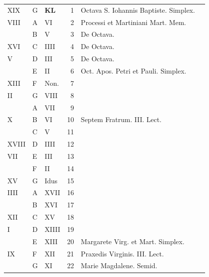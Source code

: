 \begin{center}
\begin{tabular}{l | l | l | r | l l}
\color{Red} XIX & G & \textbf{\color{Red} K\color{Blue}L} & 1 & Octava S. Iohannis Baptiste. Simplex. & \color{Red} \\
\color{Red} VIII & \color{Red} A & \color{Red} VI & 2 & Processi et Martiniani Mart. Mem. & \color{Red} \\
\color{Red}  & B & \color{Red} V & 3 & De Octava. & \color{Red} \\
\color{Red} XVI & C & \color{Red} IIII & 4 & De Octava. & \color{Red} \\
\color{Red} V & D & \color{Red} III & 5 & De Octava. & \color{Red} \\
\color{Red}  & E & \color{Red} II & 6 & \color{Red} Oct. Apos. Petri et Pauli. Simplex. \\
\color{Red} XIII & F & \color{Red} Non. & 7 & & \color{Red} \\
\color{Red} II & G & \color{Red} VIII & 8 & & \color{Red} \\
\color{Red}  & \color{Red} A & \color{Red} VII & 9 & & \color{Red} \\
\color{Red} X & B & \color{Red} VI & 10 & Septem Fratrum. III. Lect. & \color{Red} \\
\color{Red}  & C & \color{Red} V & 11 & & \color{Red} \\
\color{Red} XVIII & D & \color{Red} IIII & 12 &  & \color{Red} \\
\color{Red} VII & E & \color{Red} III & 13 & & \color{Red} \\
\color{Red}  & F & \color{Red} II & 14 & \\
\color{Red} XV & G & \color{Red} Idus & 15 & & \color{Red} \\
\color{Red} IIII & \color{Red} A & \color{Red} XVII & 16 & \\
\color{Red}  & B & \color{Red} XVI & 17 & & \color{Red} \\
\color{Red} XII & C & \color{Red} XV & 18 & \\
\color{Red} I & D & \color{Red} XIIII & 19 & & \color{Red} \\
\color{Red}  & E & \color{Red} XIII & 20 & Margarete Virg. et Mart. Simplex. & \color{Red} \\
\color{Red} IX & F & \color{Red} XII & 21 & Praxedis Virginis. III. Lect. & \color{Red} \\
\color{Red}  & G & \color{Red} XI & 22 & \color{Red} Marie Magdalene. Semid. \\

\end{tabular}
\end{center}
